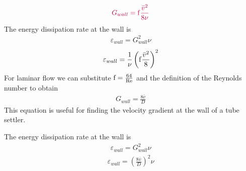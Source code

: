 \documentclass[letterpaper,10pt,english]{sphinxmanual}
\begin{document}
\begin{equation}\label{equation:Rapid_Mix/RM_Derivations:Rapid_Mix/RM_Derivations:109}
\begin{split}\color{purple}{
  G_{wall} ={\rm f}  \frac{\bar v^2}{8\nu}
}\end{split}
\end{equation}
The energy dissipation rate at the wall is
\begin{equation}\label{equation:Rapid_Mix/RM_Derivations:Rapid_Mix/RM_Derivations:110}
\begin{split}\varepsilon_{wall} = G_{wall}^2 \nu\end{split}
\end{equation}\begin{equation}\label{equation:Rapid_Mix/RM_Derivations:Rapid_Mix/RM_Derivations:111}
\begin{split}\varepsilon_{wall} = \frac{1}{\nu}\left({\rm f}  \frac{\bar v^2}{8} \right)^2\end{split}
\end{equation}
For laminar flow we can substitute \({\rm f} = \frac{64}{{\rm Re}}\) and the definition of the Reynolds number to obtain
\begin{equation}\label{equation:Rapid_Mix/RM_Derivations:Rapid_Mix/RM_Derivations:112}
\begin{split}G_{wall} =  \frac{8\bar v}{D}\end{split}
\end{equation}
This equation is useful for finding the velocity gradient at the wall of a tube settler.

The energy dissipation rate at the wall is
\begin{equation}\label{equation:Rapid_Mix/RM_Derivations:Rapid_Mix/RM_Derivations:113}
\begin{split}\varepsilon_{wall} = G_{wall}^2 \nu\end{split}
\end{equation}\begin{equation}\label{equation:Rapid_Mix/RM_Derivations:Rapid_Mix/RM_Derivations:114}
\begin{split}\varepsilon_{wall} = \left(\frac{8\bar v}{D} \right)^2 \nu\end{split}
\end{equation}
\end{document}
